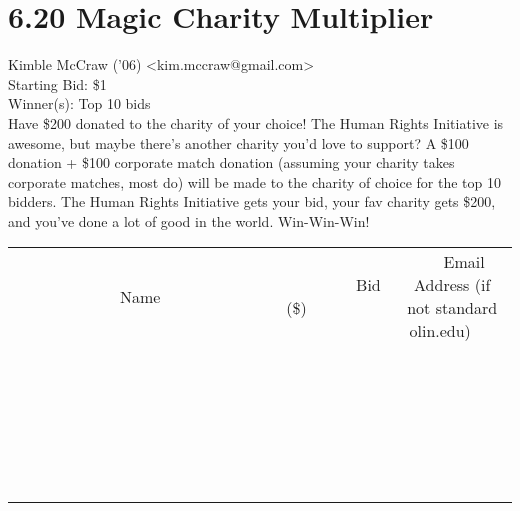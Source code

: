 \documentclass[11pt]{article}
\begin{document}
					\section*{6.20 Magic Charity Multiplier}
					Kimble McCraw ('06) <kim.mccraw@gmail.com> \\
					Starting Bid: \$1 \\
					Winner(s): Top 10 bids \\
					Have \$200 donated to the charity of your choice! The Human Rights Initiative is awesome, but maybe there's another charity you'd love to support? A \$100 donation + \$100 corporate match donation (assuming your charity takes corporate matches, most do) will be made to the charity of choice for the top 10 bidders. The Human Rights Initiative gets your bid, your fav charity gets \$200, and you've done a lot of good in the world. Win-Win-Win! \\
					[6ex]
					\begin{tabular}{c c c}
						~~~~~~~~~~~~~Name~~~~~~~~~~~~~ & ~~~~~~~~~Bid (\$)~~~~~~~~~ & ~~~Email Address (if not standard olin.edu)~~~ \\
				
 & & \\
\hline
 & & \\
\hline
 & & \\
\hline
 & & \\
\hline
 & & \\
\hline
 & & \\
\hline
 & & \\
\hline
 & & \\
\hline
 & & \\
\hline
 & & \\
\hline
 & & \\
\hline
 & & \\
\hline
 & & \\
\hline
 & & \\
\hline
 & & \\
\hline
 & & \\
\hline
 & & \\
\hline
 & & \\
\hline
 & & \\
\hline
 & & \\
\hline
 & & \\
\hline
 & & \\
\hline
 & & \\
\hline
 & & \\
\hline
 & & \\
\hline
 & & \\
\hline
					\end{tabular}
					\clearpage
				
\end{document}
